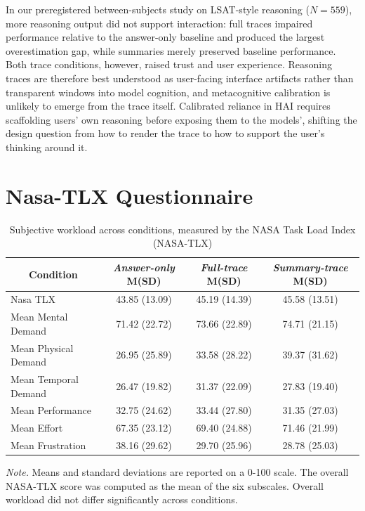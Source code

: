 \documentclass[manuscript, anonymous=false,authorversion,review=false]{acmart}
\begin{document}
In our preregistered between-subjects study on LSAT-style reasoning ($N=559$), more reasoning output did not support interaction: full traces impaired performance relative to the answer-only baseline and produced the largest overestimation gap, while summaries merely preserved baseline performance. Both trace conditions, however, raised trust and user experience. Reasoning traces are therefore best understood as user-facing interface artifacts rather than transparent windows into model cognition, and metacognitive calibration is unlikely to emerge from the trace itself. Calibrated reliance in HAI requires scaffolding users' own reasoning before exposing them to the models', shifting the design question from how to render the trace to how to support the user's thinking around it.







\appendix


\section{Nasa-TLX Questionnaire}

\begin{table}[H]
\centering
\caption{Subjective workload across conditions, measured by the NASA Task Load Index (NASA-TLX)}
\begin{tabular}{lccc}
\hline
\multicolumn{1}{c}{Condition} & \textit{Answer-only} M(SD)    & \textit{Full-trace} M(SD)      & \textit{Summary-trace}   M(SD)    \\ \hline
Nasa TLX                      & 43.85 (13.09) & 45.19 (14.39) & 45.58 (13.51) \\
Mean Mental Demand            & 71.42 (22.72) & 73.66 (22.89) & 74.71 (21.15) \\
Mean Physical Demand          & 26.95 (25.89) & 33.58 (28.22) & 39.37 (31.62) \\
Mean Temporal Demand          & 26.47 (19.82) & 31.37 (22.09) & 27.83 (19.40) \\
Mean Performance              & 32.75 (24.62) & 33.44 (27.80) & 31.35 (27.03) \\
Mean Effort                   & 67.35 (23.12) & 69.40 (24.88) & 71.46 (21.99)  \\
Mean Frustration              & 38.16 (29.62) & 29.70 (25.96) & 28.78 (25.03)   \\
\hline
\end{tabular}
\label{tab:nasa}

\raggedright \small \textit{Note.} Means and standard deviations are reported on a 0-100 scale. The overall NASA-TLX score was computed as the mean of the six subscales. Overall workload did not differ significantly across conditions.
\end{table}
\end{document}
